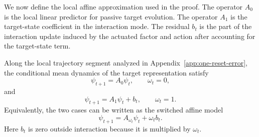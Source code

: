 


We now define the local affine approximation used in the proof.
The operator $A_0$ is the local linear predictor for passive target evolution.
The operator $A_1$ is the target-state coefficient in the interaction mode.
The residual $b_t$ is the part of the interaction update induced by the actuated factor and action after accounting for the target-state term.

\begin{assumption}
\label{ass:mode-wise-linear}
Along the local trajectory segment analyzed in Appendix~\ref{app:one-reset-error}, the conditional mean dynamics of the target representation satisfy
\[
    \psi_{t+1}
    =
    A_0\psi_t,
    \qquad
    \omega_t=0,
\]
and
\[
    \psi_{t+1}
    =
    A_1\psi_t+b_t,
    \qquad
    \omega_t=1.
\]
Equivalently, the two cases can be written as the switched affine model
\[
    \psi_{t+1}
    =
    A_{\omega_t}\psi_t+\omega_t b_t.
\]
Here $b_t$ is zero outside interaction because it is multiplied by $\omega_t$.
\end{assumption}

